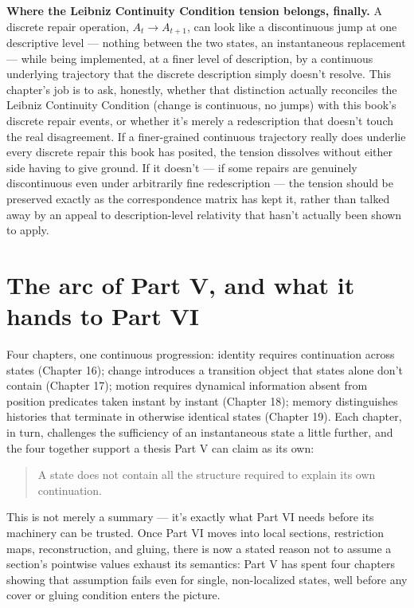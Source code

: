 \textbf{Where the Leibniz Continuity Condition tension belongs, finally.} A
discrete repair operation, \(A_t \to A_{t+1}\), can look like a
discontinuous jump at one descriptive level --- nothing between the two
states, an instantaneous replacement --- while being implemented, at a
finer level of description, by a continuous underlying trajectory that
the discrete description simply doesn't resolve. This chapter's job is to
ask, honestly, whether that distinction actually reconciles the Leibniz
Continuity Condition (change is continuous, no jumps) with this book's
discrete repair events, or whether it's merely a redescription that
doesn't touch the real disagreement. If a finer-grained continuous
trajectory really does underlie every discrete repair this book has
posited, the tension dissolves without either side having to give
ground. If it doesn't --- if some repairs are genuinely discontinuous even
under arbitrarily fine redescription --- the tension should be preserved
exactly as the correspondence matrix has kept it, rather than talked
away by an appeal to description-level relativity that hasn't actually
been shown to apply.

\hypertarget{the-arc-of-part-v-and-what-it-hands-to-part-vi}{%
\section{The arc of Part V, and what it hands to Part VI}\label{the-arc-of-part-v-and-what-it-hands-to-part-vi}}

Four chapters, one continuous progression: identity requires continuation
across states (Chapter 16); change introduces a transition object that
states alone don't contain (Chapter 17); motion requires dynamical
information absent from position predicates taken instant by instant
(Chapter 18); memory distinguishes histories that terminate in otherwise
identical states (Chapter 19). Each chapter, in turn, challenges the
sufficiency of an instantaneous state a little further, and the four
together support a thesis Part V can claim as its own:

\begin{quote}
A state does not contain all the structure required to explain its own
continuation.
\end{quote}

This is not merely a summary --- it's exactly what Part VI needs before its
machinery can be trusted. Once Part VI moves into local sections,
restriction maps, reconstruction, and gluing, there is now a stated
reason not to assume a section's pointwise values exhaust its semantics:
Part V has spent four chapters showing that assumption fails even for
single, non-localized states, well before any cover or gluing condition
enters the picture.

